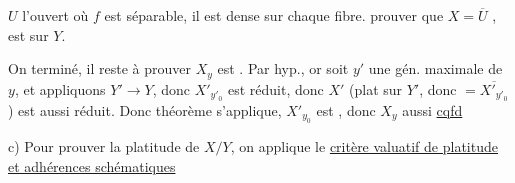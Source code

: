 $U$ l'ouvert où $f$ est séparable, il est dense sur chaque fibre.  prouver que $X=\overline U$ , est   sur $Y$.

On  terminé,  il reste à prouver $X_y$ est . Par hyp., or soit $y'$ une gén. maximale de $y$, et appliquons $Y'\longrightarrow Y$, donc $X'_{y'_0}$ est réduit, donc $X'$ (plat sur $Y'$, donc $=\overline{X'_{y'_0}}$ ) est aussi réduit. Donc théorème s'applique, $X'_{y_0}$  est , donc $X_y$ aussi \uline{cqfd}

c) Pour prouver la platitude de $X/Y$, on applique le \uline{critère valuatif de platitude et  adhérences schématiques}
